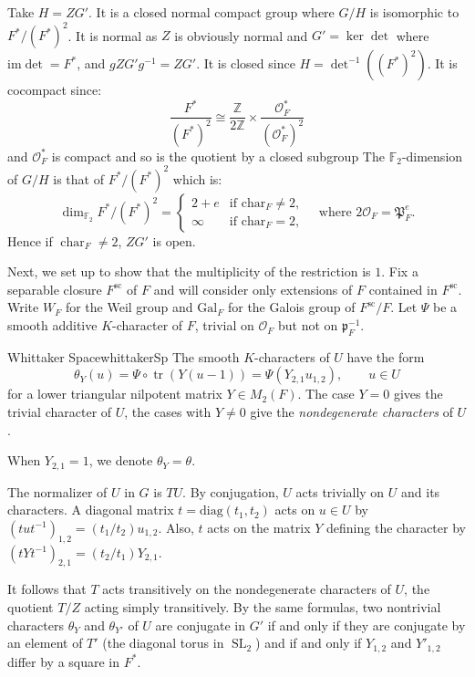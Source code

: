 \documentclass{article}
\newcommand{\Z}{{\mathbb{Z}}}
\newcommand{\CO}{{\mathcal{O}}}
\newcommand{\FP}{{\mathfrak{P}}}
\newcommand{\tr}{{\operatorname{tr}}}
\newcommand{\SL}{{\operatorname{SL}}}
\newcommand{\qn}{\quad\newline}
\begin{document}
Take $H= ZG'$. It is a closed normal compact group where $G/H$ is isomorphic to $F^*/(F^*)^2$. It is
normal as $Z$ is obviously normal and $G' = \ker\det$ where $\mathrm{im}\det = F^*$, and $gZG'g^{-1} = ZG'$. It is
closed since $H= \det^{-1}\left((F^*)^2\right)$. It is cocompact since:
\[
  \frac{F^*}{\left(F^*\right)^2} \cong \frac{\Z}{2\Z} \times \frac{\CO_F^*}{(\CO_F^*)^2}
\]
and $\CO_F^*$ is compact and so is the quotient by a closed subgroup The $\mathbb{F}_2$-dimension of $G/H$ is that of
$F^*/(F^*)^2$ which is:
\begin{equation}\label{eq:4-1}
\dim_{\mathbb{F}_2} F^* / (F^*)^2 =
\begin{cases}
2 + e & \text{if } \text{char}_F \neq 2, \\
\infty & \text{if } \text{char}_F = 2,
\end{cases}
\quad \text{where } 2\CO_F = \FP_F^e.
\end{equation}
Hence if $\operatorname{char}_F \ne 2$, $ZG'$ is open.


Next, we set up to show that the multiplicity of the restriction is $1$. Fix a separable closure $F^{\mathrm{sc}}$ of $F$ and will consider only extensions of $F$ contained in
$F^{\mathrm{sc}}$. Write $W_F$ for the Weil group and $\mathrm{Gal}_F$ for the Galois group of
$F^{\mathrm{sc}}/F$. Let $\Psi$ be a smooth additive $K$-character of $F$, trivial on $\CO_F$ but not on
$\mathfrak{p}_F^{-1}$.

\begin{defn}{Whittaker Space}{whittakerSp}
  The smooth $K$-characters of $U$ have the form
  \[
    \theta_Y(u) = \Psi \circ \tr(Y(u-1)) = \Psi(Y_{2,1}u_{1,2}), \qquad u\in U
  \]
  for a lower triangular nilpotent matrix $Y \in M_2(F)$. The case $Y=0$ gives the trivial character of $U$,
  the cases with $Y\ne 0$ give the \emph{nondegenerate characters} of $U$.

  \qn
  When $Y_{2,1} = 1$, we denote $\theta_Y = \theta$.
\end{defn}


The normalizer of $U$ in $G$ is $TU$. By conjugation, $U$ acts trivially on $U$ and its characters. A diagonal matrix $t = \mathrm{diag}(t_1, t_2)$ acts on $u \in U$ by $(tut^{-1})_{1,2} = (t_1/t_2)u_{1,2}$. Also, $t$ acts on the matrix $Y$ defining the character by $(tYt^{-1})_{2,1} = (t_2/t_1)Y_{2,1}$.

It follows that $T$ acts transitively on the nondegenerate characters of $U$, the quotient $T/Z$ acting simply transitively. By the same formulas, two nontrivial characters $\theta_Y$ and $\theta_{Y'}$ of $U$ are conjugate in $G'$ if and only if they are conjugate by an element of $T'$ (the diagonal torus in $\SL_2$) and if and only if $Y_{1,2}$ and $Y'_{1,2}$ differ by a square in $F^*$.
\end{document}
